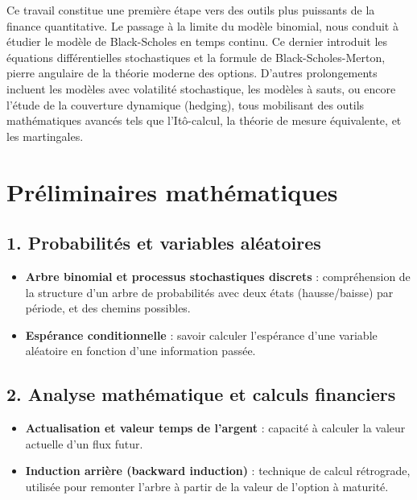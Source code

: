 \documentclass[12pt,a4paper]{article}
\begin{document}
Ce travail constitue une première étape vers des outils plus puissants de la finance quantitative. Le passage à la limite du modèle binomial, nous conduit à étudier le modèle de Black-Scholes en temps continu. Ce dernier introduit les équations différentielles stochastiques et la formule de Black-Scholes-Merton, pierre angulaire de la théorie moderne des options. D’autres prolongements incluent les modèles avec volatilité stochastique, les modèles à sauts, ou encore l’étude de la couverture dynamique (hedging), tous mobilisant des outils mathématiques avancés tels que l’Itô-calcul, la théorie de mesure équivalente, et les martingales.

\newpage

\appendix

\section{Préliminaires mathématiques}
\subsection*{1. Probabilités et variables aléatoires}

\begin{itemize}
    \item \textbf{Arbre binomial et processus stochastiques discrets} : compréhension de la structure d’un arbre de probabilités avec deux états (hausse/baisse) par période, et des chemins possibles.
    \item \textbf{Espérance conditionnelle} : savoir calculer l’espérance d’une variable aléatoire en fonction d’une information passée.
\end{itemize}

\subsection*{2. Analyse mathématique et calculs financiers}

\begin{itemize}
    \item \textbf{Actualisation et valeur temps de l'argent} : capacité à calculer la valeur actuelle d’un flux futur.
    \item \textbf{Induction arrière (backward induction)} : technique de calcul rétrograde, utilisée pour remonter l’arbre à partir de la valeur de l’option à maturité.
\end{itemize}
\end{document}

